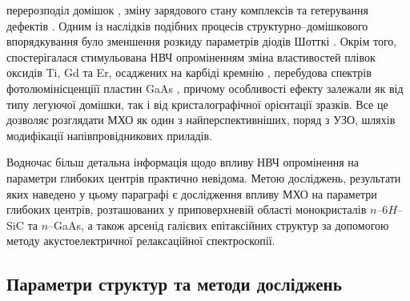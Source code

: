 перерозподіл домішок \cite{Bacherikov2003r,Belyaev1998JTFr,Konakova2015},
зміну зарядового стану комплексів \cite{Milenin1994}
та гетерування дефектів \cite{Belyaev1998JTFr}.
Одним із наслідків подібних процесів структурно--домішкового впорядкування було зменшення розкиду параметрів діодів Шотткі \cite{Milenin1994,Belyaev1998JTFr}.
Окрім того, спостерігалася стимульована НВЧ опроміненням
зміна властивостей плівок оксидів Ti, Gd та Er, осаджених на карбіді кремнію \cite{Bacherikov2008},
перебудова спектрів фотолюмінісценціїї пластин GaAs \cite{BelyaevIntac,ProcSPIE,Belyaev1998JTFr},
причому особливості ефекту залежали як від типу легуючої домішки, так і від кристалографічної орієнтації зразків.
Все це дозволяє розглядати МХО як один з найперспективніших, поряд з УЗО, шляхів модифікації напівпровідникових приладів.

Водночас більш детальна інформація щодо впливу НВЧ опромінення на параметри глибоких центрів практично невідома.
Метою досліджень, результати яких наведено у цьому параграфі є дослідження впливу МХО на параметри глибоких центрів, розташованих у приповерхневій області монокристалів $n$--6$H$--SiC та $n$--GaAs, а також арсенід галієвих епітаксійних структур за допомогою методу акустоелектричної релаксаційної спектроскопії.



\subsection{Параметри структур та методи досліджень}

